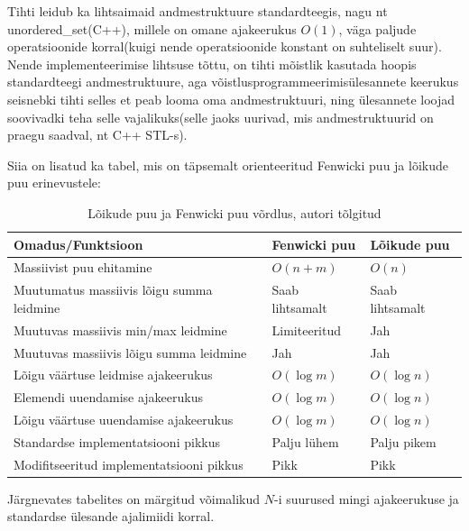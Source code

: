 \documentclass{trkut}
\theoremstyle{definition}
\begin{document}
Tihti leidub ka lihtsaimaid andmestruktuure standardteegis, nagu nt unordered\_set(C++), millele on omane ajakeerukus $O(1)$, väga paljude operatsioonide korral(kuigi nende operatsioonide konstant on suhteliselt suur). 
Nende implementeerimise lihtsuse tõttu, on tihti mõistlik kasutada hoopis standardteegi andmestruktuure, aga võistlusprogrammeerimisülesannete keerukus seisnebki tihti selles et peab looma oma andmestruktuuri, ning ülesannete loojad soovivadki teha selle vajalikuks(selle jaoks uurivad, mis andmestruktuurid on praegu saadval, nt C++ STL-s).

Siia on lisatud ka tabel, mis on täpsemalt orienteeritud Fenwicki puu ja lõikude puu erinevustele:
\begin{table}[H]
\caption{Lõikude puu ja Fenwicki puu võrdlus, autori tõlgitud}
\begin{tabular}{|l|l|l|}
\hline
Omadus/Funktsioon                         & Fenwicki puu    & Lõikude puu     \\ \hline
Massiivist puu ehitamine                  & $O(n+m)$        & $O(n)$          \\ \hline
Muutumatus massiivis lõigu summa leidmine & Saab lihtsamalt & Saab lihtsamalt \\ \hline
Muutuvas massiivis min/max leidmine       & Limiteeritud    & Jah             \\ \hline
Muutuvas massiivis lõigu summa leidmine   & Jah             & Jah             \\ \hline
Lõigu väärtuse leidmise ajakeerukus       & $O(\log m)$     & $O(\log n)$     \\ \hline
Elemendi uuendamise ajakeerukus           & $O(\log m)$     & $O(\log n)$     \\ \hline
Lõigu väärtuse uuendamise ajakeerukus     & $O(\log m)$     & $O(\log n)$     \\ \hline
Standardse implementatsiooni pikkus       & Palju lühem     & Palju pikem     \\ \hline
Modifitseeritud implementatsiooni pikkus  & Pikk            & Pikk            \\ \hline
\end{tabular}  
\end{table}


Järgnevates tabelites on märgitud võimalikud $N$-i suurused mingi ajakeerukuse ja standardse ülesande ajalimiidi korral\parencite{timecomplexity}. 
\end{document}
